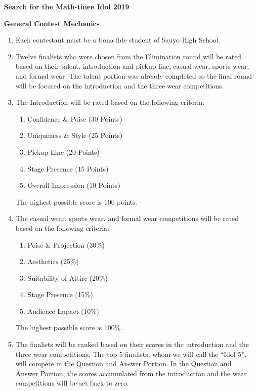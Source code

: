 \documentclass[11pt]{article}
\begin{document}
 

\begin{center}
\textbf{Search for the Math-tinee Idol 2019}
\end{center} 

\textbf{General Contest Mechanics} 
\begin{enumerate}[label = \arabic*. ]
\item Each contestant must be a bona fide student of Sauyo High School. 
\item Twelve finalists who were chosen from the Elimination round will be rated based on their talent, introduction and pickup line, casual wear, sports wear, and formal wear. The talent portion was already completed so the final round will be focused on the introduction and the three wear competitions. 
\item The Introduction will be rated based on the following criteria: 
\begin{enumerate}[label = \alph*. ]
\item Confidence \& Poise (30 Points)
\item Uniqueness \& Style (25 Points)
\item Pickup Line (20 Points)
\item Stage Presence (15 Points)
\item Overall Impression (10 Points)
\end{enumerate}  
The highest possible score is 100 points. 
\item The casual wear, sports wear, and formal wear competitions will be rated based on the following criteria: 
\begin{enumerate}[label = \alph*. ]
\item Poise \& Projection (30\%)
\item Aesthetics (25\%)
\item Suitability of Attire (20\%)
\item Stage Presence (15\%)
\item Audience Impact (10\%)
\end{enumerate}  
The highest possible score is 100\%. 
\item The finalists will be ranked based on their scores in the introduction and the three wear competitions. The top 5 finalists, whom we will call the ``Idol 5'', will compete in the Question and Answer Portion. In the Question and Answer Portion, the scores accumulated from the introduction and the wear competitions will be set back to zero. 

\end{enumerate}
\end{document}
